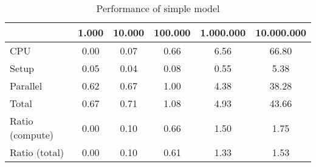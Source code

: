 \begin{table}[!h]
\centering
\caption{Performance of simple model}
\begin{tabular}{l*{5}{c}}\hline
& 1.000 &          10.000 &         100.000 &       1.000.000 &      10.000.000 \\ \hline
CPU &     0.00 &      0.07 &      0.66 &      6.56 &     66.80 \\
Setup &     0.05 &      0.04 &      0.08 &      0.55 &      5.38 \\
Parallel &     0.62 &      0.67 &      1.00 &      4.38 &     38.28 \\
Total &     0.67 &      0.71 &      1.08 &      4.93 &     43.66 \\
Ratio (compute) &     0.00 &      0.10 &      0.66 &      1.50 &      1.75 \\
Ratio (total) &     0.00 &      0.10 &      0.61 &      1.33 &      1.53 \\
\hline
\end{tabular}
\end{table}
